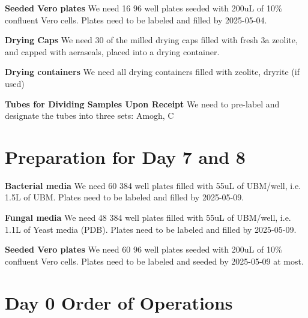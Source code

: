 \documentclass{article}
\begin{document}
\textbf{Seeded Vero plates} We need 16 96 well plates seeded with 200uL of 10\% confluent Vero cells. Plates need to be labeled and filled by 2025-05-04.

\textbf{Drying Caps} We need 30 of the milled drying caps filled with fresh 3a zeolite, and capped with aeraseals, placed into a drying container. 

\textbf{Drying containers} We need all drying containers filled with zeolite, dryrite (if used) 

\textbf{Tubes for Dividing Samples Upon Receipt} We need to pre-label and designate the tubes into three sets: Amogh, C

\section{Preparation for Day 7 and 8}\label{sec:day7-prep}
\textbf{Bacterial media} We need 60 384 well plates filled with 55uL of UBM/well, i.e. 1.5L of UBM. Plates need to be labeled and filled by 2025-05-09.

\textbf{Fungal media} We need 48 384 well plates filled with 55uL of UBM/well, i.e. 1.1L of Yeast media (PDB). Plates need to be labeled and filled by 2025-05-09.

\textbf{Seeded Vero plates} We need 60 96 well plates seeded with 200uL of 10\% confluent Vero cells. Plates need to be labeled and seeded by 2025-05-09 at most. 

\section{Day 0 Order of Operations} \label{day0instructions}
\end{document}
